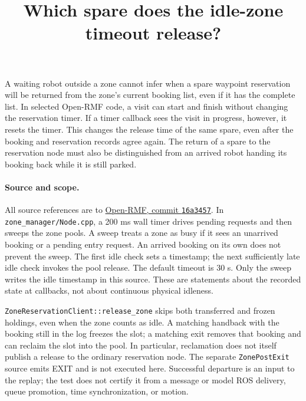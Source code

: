 \documentclass{article}
\title{Which spare does the idle-zone timeout release?}
\begin{document}
\maketitle

A waiting robot outside a zone cannot infer when a spare waypoint reservation will be returned from the zone's current booking list, even if it has the complete list. In selected Open-RMF code, a visit can start and finish without changing the reservation timer. If a timer callback sees the visit in progress, however, it resets the timer. This changes the release time of the same spare, even after the booking and reservation records agree again. The return of a spare to the reservation node must also be distinguished from an arrived robot handing its booking back while it is still parked.

\paragraph{Source and scope.}
All source references are to \href{https://github.com/open-rmf/rmf_ros2/tree/16a3457196c6edf2f08a1ba4f497bf891404cbb7}{Open-RMF, commit \texttt{16a3457}}. In \texttt{zone\_manager/Node.cpp}, a 200 ms wall timer drives pending requests and then sweeps the zone pools. A sweep treats a zone as busy if it sees an unarrived booking or a pending entry request. An arrived booking on its own does not prevent the sweep. The first idle check sets a timestamp; the next sufficiently late idle check invokes the pool release. The default timeout is 30 s. Only the sweep writes the idle timestamp in this source. These are statements about the recorded state at callbacks, not about continuous physical idleness.

\texttt{ZoneReservationClient::release\_zone} skips both transferred and frozen holdings, even when the zone counts as idle. A matching handback with the booking still in the log freezes the slot; a matching exit removes that booking and can reclaim the slot into the pool. In particular, reclamation does not itself publish a release to the ordinary reservation node. The separate \texttt{ZonePostExit} source emits EXIT and is not executed here. Successful departure is an input to the replay; the test does not certify it from a message or model ROS delivery, queue promotion, time synchronization, or motion.
\end{document}
